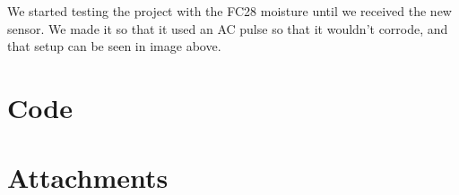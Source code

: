 \documentclass{article}
\begin{document}
We started testing the project with the FC28 moisture until we received the new sensor. We made it so that it used an AC pulse so that it wouldn't corrode, and that setup can be seen in image above.


\section{Code}





\section{Attachments} 
\pagebreak
{}

\nocite{*}
% 
\end{document}
